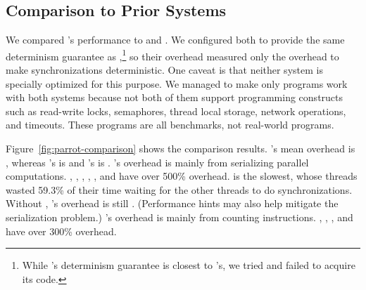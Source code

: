 
\subsection{Comparison to Prior Systems} \label{sec:parrot-comparison}

We compared \parrot's performance to \dthreads and \coredet.  We configured
both to provide the same determinism guarantee as \parrot,\footnote{While
  \kendo's determinism guarantee is closest to \parrot's, we tried and failed
  to acquire its code.}  so their overhead measured only the overhead to
make synchronizations deterministic.  One caveat is that neither system is
specially optimized for this purpose.  We managed to make only
\nprogcompared programs work with both systems because not both of them
support programming constructs such as read-write locks, semaphores,
thread local storage, network operations, and timeouts. These programs are
all benchmarks, not real-world programs.

Figure~\ref{fig:parrot-comparison} shows the comparison results.
\parrot's mean overhead is \parrotcompoverhead,
whereas \dthreads's is \dthreadssyncoverhead and \coredet's is
\coredetoverhead. 
\dthreads's overhead is mainly from serializing
parallel computations. \dedup, \ferret, \fluidanimate, 
\barnes, \radiosity, and \raytrace have over 500\%
overhead.  \fluidanimate is the slowest, whose threads wasted 59.3\% of their time
waiting for the other threads to do synchronizations.
Without \fluidanimate, \dthreads's overhead is still
\dthreadssyncoverheadnoflui.  (Performance hints may also help
\dthreads mitigate the serialization problem.)  \coredet's overhead is
mainly from counting instructions. \ferret, \fluidanimate, \barnes, and
\raytrace have over 300\% overhead.

